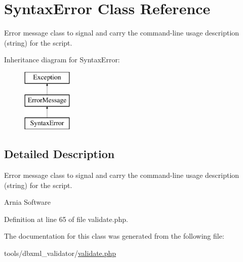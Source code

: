 \hypertarget{classSyntaxError}{\section{Syntax\+Error Class Reference}
\label{classSyntaxError}
}


Error message class to signal and carry the command-\/line usage description (string) for the script.  


Inheritance diagram for Syntax\+Error\+:\begin{figure}[H]
\begin{center}
\leavevmode
\includegraphics[height=3.000000cm]{classSyntaxError}
\end{center}
\end{figure}


\subsection{Detailed Description}
Error message class to signal and carry the command-\/line usage description (string) for the script. 

Arnia Software 

Definition at line 65 of file validate.\+php.



The documentation for this class was generated from the following file\+:\begin{DoxyCompactItemize}
\item 
tools/dbxml\+\_\+validator/\hyperlink{validate_8php}{validate.\+php}\end{DoxyCompactItemize}
